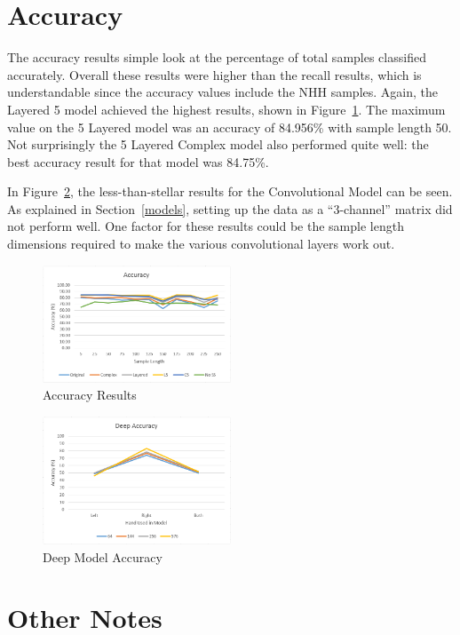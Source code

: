 \documentclass[]{report}
\begin{document}
\section{Accuracy}

The accuracy results simple look at the percentage of total samples classified accurately. Overall these results were higher than the recall results, which is understandable since the accuracy values include the NHH samples. Again, the Layered 5 model achieved the highest results, shown in Figure~\ref{accuracy}. The maximum value on the 5 Layered model was an accuracy of 84.956\% with sample length 50. Not surprisingly the 5 Layered Complex model also performed quite well: the best accuracy result for that model was 84.75\%.

In Figure~\ref{acuracy-deep}, the less-than-stellar results for the Convolutional Model can be seen. As explained in Section~\ref{models}, setting up the data as a ``3-channel'' matrix did not perform well. One factor for these results could be the sample length dimensions required to make the various convolutional layers work out. 

\begin{figure}
	\centering
	\includegraphics[width=0.5\textwidth]{../images/accuracy2}
	\caption{Accuracy Results}
	\label{accuracy}
\end{figure}
\begin{figure}
	\centering
	\includegraphics[width=0.5\textwidth]{../images/deepresults}
	\caption{Deep Model Accuracy}
	\label{acuracy-deep}
\end{figure}

\section{Other Notes}
\end{document}
